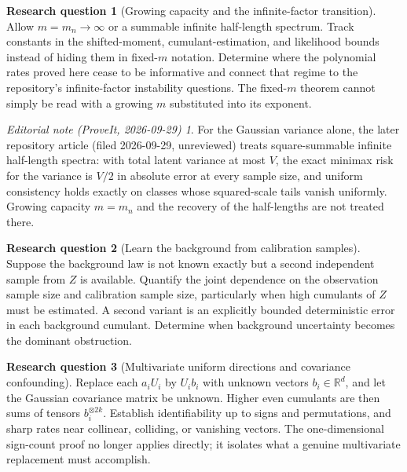 \documentclass[11pt,a4paper]{article}
\numberwithin{equation}{section}
\theoremstyle{definition}
\newtheorem{problem}{Research question}
\theoremstyle{remark}
\newtheorem*{ednote}{Editorial note (ProveIt, 2026-09-29)}
\newcommand{\R}{\mathbb R}
\begin{document}
\begin{problem}[Growing capacity and the infinite-factor transition]
Allow $m=m_n\to\infty$ or a summable infinite half-length spectrum. Track
constants in the shifted-moment, cumulant-estimation, and likelihood bounds
instead of hiding them in fixed-$m$ notation. Determine where the polynomial
rates proved here cease to be informative and connect that regime to the
repository's infinite-factor instability questions. The fixed-$m$ theorem
cannot simply be read with a growing $m$ substituted into its exponent.
\end{problem}
\begin{ednote}
For the Gaussian variance alone, the later repository article 
(filed 2026-09-29, unreviewed) treats square-summable infinite half-length
spectra: with total latent variance at most $V$, the exact minimax risk for
the variance is $V/2$ in absolute error at every sample size, and uniform
consistency holds exactly on classes whose squared-scale tails vanish
uniformly. Growing capacity $m=m_n$ and the recovery of the half-lengths
are not treated there.
\end{ednote}

\begin{problem}[Learn the background from calibration samples]
Suppose the background law is not known exactly but a second independent
sample from $Z$ is available. Quantify the joint dependence on the observation
sample size and calibration sample size, particularly when high cumulants of
$Z$ must be estimated. A second variant is an explicitly bounded deterministic
error in each background cumulant. Determine when background uncertainty
becomes the dominant obstruction.
\end{problem}

\begin{problem}[Multivariate uniform directions and covariance confounding]
Replace each $a_iU_i$ by $U_i b_i$ with unknown vectors $b_i\in\R^d$, and let
the Gaussian covariance matrix be unknown. Higher even cumulants are then
sums of tensors $b_i^{\otimes 2k}$. Establish identifiability up to signs and
permutations, and sharp rates near collinear, colliding, or vanishing vectors.
The one-dimensional sign-count proof no longer applies directly; it isolates
what a genuine multivariate replacement must accomplish.
\end{problem}
\end{document}
